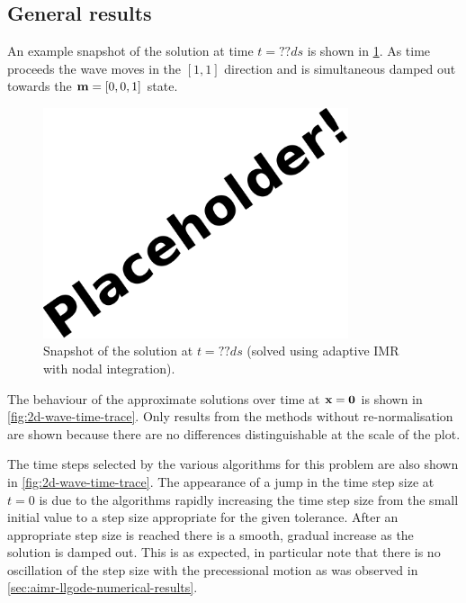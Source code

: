 \subsection{General results}

An example snapshot of the solution at time $t=??ds$ is shown in \cref{fig:2d-wave-snapshot}.
As time proceeds the wave moves in the $[1,1]$ direction and is simultaneous damped out towards the $\boldsymbol{\mathrm{m}} = [0,0,1]$ state.

\begin{figure}
  \centering
  \includegraphics[width=0.8\textwidth]{images/placeholder}
  \caption{Snapshot of the solution at $t=??ds$ (solved using adaptive IMR with nodal integration).}
  \label{fig:2d-wave-snapshot}
\end{figure}

The behaviour of the approximate solutions over time at $\boldsymbol{\mathrm{x}} = \mathbf{0}$ is shown in \cref{fig:2d-wave-time-trace}.
Only results from the methods without re-normalisation are shown because there are no differences distinguishable at the scale of the plot.

The time steps selected by the various algorithms for this problem are also shown in \cref{fig:2d-wave-time-trace}.
The appearance of a jump in the time step size at $t=0$ is due to the algorithms rapidly increasing the time step size from the small initial value to a step size appropriate for the given tolerance.
After an appropriate step size is reached there is a smooth, gradual increase as the solution is damped out.
This is as expected, in particular note that there is no oscillation of the step size with the precessional motion as was observed in \cref{sec:aimr-llgode-numerical-results}.

